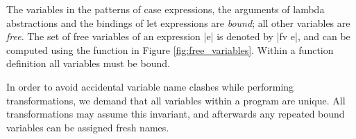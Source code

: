 The variables in the patterns of case expressions, the arguments of lambda abstractions and the bindings of let expressions are \textit{bound}; all other variables are \textit{free}. The set of free variables of an expression |e| is denoted by |fv e|, and can be computed using the function in Figure \ref{fig:free_variables}. Within a function definition all variables must be bound.

In order to avoid accidental variable name clashes while performing transformations, we demand that all variables within a program are unique. All transformations may assume this invariant, and afterwards any repeated bound variables can be assigned fresh names.

\begin{comment}
\subsubsection{The |split| operation}

\begin{figure}
\begin{tabular}{rcl}
|split(v)| & |=| & |(v, [])| \\
|split(c)| & |=| & |(c, [])| \\
|split(f)| & |=| & |(f, [])| \\
|split(x ys_)| & |=| & |(bullet {-"\text{ } \overline{\bullet} "-}, x:ys_)| \\
|split(\vs_ -> x)| & |=| & |(\vs_ -> bullet, x)| \\
|split(let v = x in y)| & |=| & |(let v = bullet in bullet, [x,y])| \\
|split(case x of {p_1 \! -> \! y_1 ; ... ; p_n \! -> \! y_n})| & |=| & |(case {-"\hspace{-1mm}"-} bullet {-"\hspace{-1mm}"-} of {p_1 \! -> \! bullet ; ... ; p_n \! -> \! bullet}, [x, y_1, ... ,y_n])|
\end{tabular}
\caption{The |split| function, returning a spine and all subexpressions.}
\label{fig:split}
\end{figure}

We define the |split| function in Figure \ref{fig:split}, which splits an expression into a pair of its spine and its immediate subexpressions. The $\bullet$ markers in the spine indicate the positions from which subexpressions have been removed. We define the |join| operation to be the inverse of |split|, taking a spine and a list of expressions, and producing an expression.
\end{comment}


